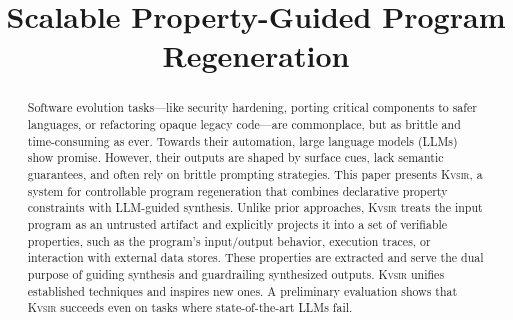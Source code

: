 \documentclass[sigplan,review,anonymous,10pt]{acmart}
\newcommand{\sys}{{\scshape Kv{\textalpha}sir}\xspace}
\begin{document}
\title{Scalable Property-Guided Program Regeneration}
\author{}



\begin{abstract}
  Software evolution tasks---like security hardening, porting critical components to safer 
  languages, or refactoring opaque legacy code---are commonplace, but as brittle and time-consuming as ever.
  Towards their automation, large language models (LLMs) show promise.
  However, their outputs are shaped by surface cues, lack semantic guarantees, and often rely on brittle prompting strategies.
  This paper presents \sys, a system for controllable program regeneration that
  combines declarative property constraints with LLM-guided synthesis.
  Unlike
  prior approaches, \sys treats the input program as an untrusted artifact and
  explicitly projects it into a set of verifiable properties, such as
  the program's input/output behavior, execution traces, or interaction with external data stores.
  These properties are extracted and serve the dual purpose of guiding synthesis and guardrailing synthesized outputs.
  \sys unifies established techniques and inspires new ones. %
  A preliminary evaluation shows that \sys succeeds even on tasks where state-of-the-art LLMs fail.
\end{abstract}

\end{document}

